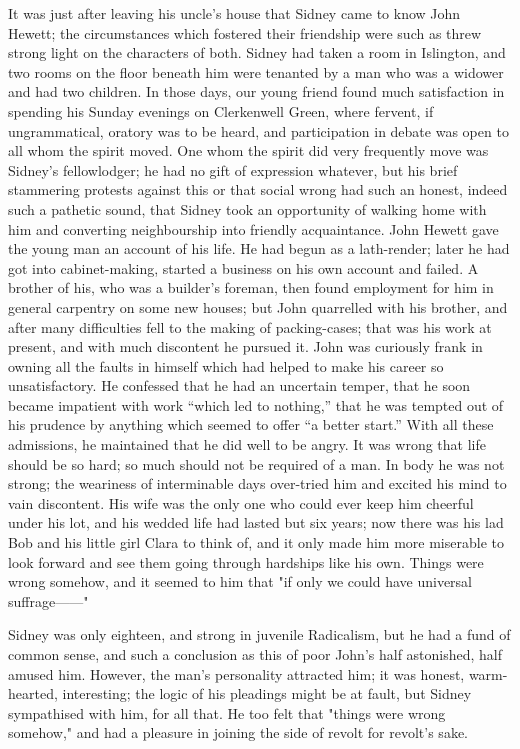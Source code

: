It was just after leaving his uncle's house that Sidney came to know
John Hewett; the circumstances which fostered their friendship were such
as threw strong light on the characters of both. Sidney had taken a room
in Islington, and two rooms on the floor beneath him were tenanted by a
man who was a widower and had two children. In those days, our young
friend found much satisfaction in spending his Sunday evenings on
Clerkenwell Green, where fervent, if ungrammatical, oratory was to be
heard, and participation in debate was open to all whom the spirit
moved. One whom the spirit did very frequently move was Sidney's
fellowlodger; he had no gift of expression
{\protect\hypertarget{127}{}{}}whatever, but his brief stammering
protests against this or that social wrong had such an honest, indeed
such a pathetic sound, that Sidney took an opportunity of walking home
with him and converting neighbourship into friendly acquaintance. John
Hewett gave the young man an account of his life. He had begun as a
lath-render; later he had got into cabinet-making, started a business on
his own account and failed. A brother of his, who was a builder's
foreman, then found employment for him in general carpentry on some new
houses; but John quarrelled with his brother, and after many
difficulties fell to the making of packing-cases; that was his work at
present, and with much discontent he pursued it. John was curiously
frank in owning all the faults in himself which had helped to make his
career so unsatisfactory. He confessed that he had an uncertain temper,
that he soon became impatient with work ``which led to nothing,'' that
he was tempted out of his prudence by anything which seemed to offer ``a
better start.'' With all these admissions, he
{\protect\hypertarget{128}{}{}}maintained that he did well to be angry.
It was wrong that life should be so hard; so much should not be required
of a man. In body he was not strong; the weariness of interminable days
over-tried him and excited his mind to vain discontent. His wife was the
only one who could ever keep him cheerful under his lot, and his wedded
life had lasted but six years; now there was his lad Bob and his little
girl Clara to think of, and it only made him more miserable to look
forward and see them going through hardships like his own. Things were
wrong somehow, and it seemed to him that "if only we could have
universal suffrage{{------}}"

Sidney was only eighteen, and strong in juvenile Radicalism, but he had
a fund of common sense, and such a conclusion as this of poor John's
half astonished, half amused him. However, the man's personality
attracted him; it was honest, warm-hearted, interesting; the logic of
his pleadings might be at fault, but Sidney sympathised with him, for
all that. He too felt that "things were
{\protect\hypertarget{129}{}{}}wrong somehow," and had a pleasure in
joining the side of revolt for revolt's sake.

